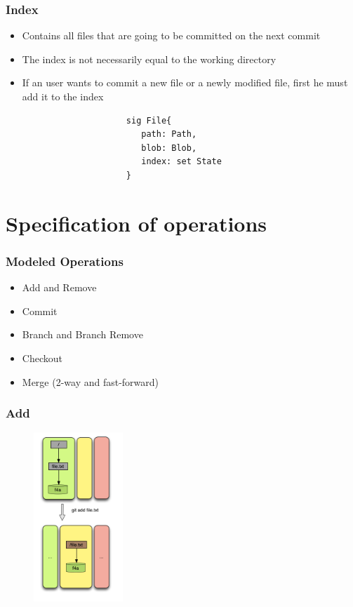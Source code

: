 \documentclass{beamer}
\begin{document}
\begin{frame}[fragile]
   \frametitle{Index}
   \begin{itemize}
      \item Contains all files that are going to be committed on the next
      commit 
      \item The index is not necessarily equal to the working directory
      \item If an user wants to commit a new file or a newly modified file,
      first he must add it to the index
   \end{itemize}
   \vspace{10mm}
   \tiny
   \color{blue}
   \begin{lstlisting}
                        sig File{
                           path: Path,
                           blob: Blob,
                           index: set State
                        }

   \end{lstlisting}

\end{frame}


\section{Specification of operations}

\begin{frame}[fragile]
   \frametitle{Modeled Operations}
   \begin{itemize}
      \item Add and Remove
      \item Commit
      \item Branch and Branch Remove
      \item Checkout
      \item Merge (2-way and fast-forward)
   \end{itemize}
\end{frame}

\begin{frame}[fragile]
   \frametitle{Add}
   \begin{figure}
      \centering
      \includegraphics[width=0.3\textwidth]{images/add1.png}
   \end{figure}
\end{frame}
\end{document}
